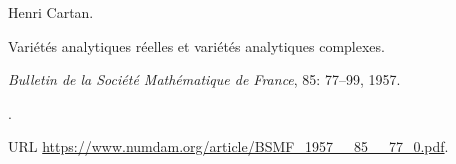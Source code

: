 Henri Cartan.

\newblock Vari\'et\'es analytiques r\'eelles et vari\'et\'es analytiques
  complexes.

\newblock \emph{Bulletin de la Soci\'et\'e Math\'ematique de France},
  85: 77--99, 1957.

\newblock {}.

\newblock URL \url{https://www.numdam.org/article/BSMF_1957__85__77_0.pdf}.

